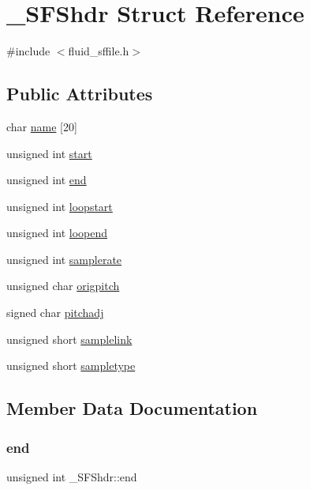 \hypertarget{struct__SFShdr}{}\section{\+\_\+\+S\+F\+Shdr Struct Reference}
\label{struct__SFShdr}


{\ttfamily \#include $<$fluid\+\_\+sffile.\+h$>$}

\subsection*{Public Attributes}
\begin{DoxyCompactItemize}
\item 
char \hyperlink{struct__SFShdr_ab26b0060affda31a0cab172d4caab7c0}{name} \mbox{[}20\mbox{]}
\item 
unsigned int \hyperlink{struct__SFShdr_a9c81221f5aa50e9ff3ce5641e6eefccc}{start}
\item 
unsigned int \hyperlink{struct__SFShdr_a7eeff297beb33b30f22b9e169abfc638}{end}
\item 
unsigned int \hyperlink{struct__SFShdr_a70ef5d37c79dcaf9274914b14225042b}{loopstart}
\item 
unsigned int \hyperlink{struct__SFShdr_af9a507e366da9ede0215871f94c3c68a}{loopend}
\item 
unsigned int \hyperlink{struct__SFShdr_a9a8bedaf06291953af81cf889d5f073a}{samplerate}
\item 
unsigned char \hyperlink{struct__SFShdr_a05e08d087cc2121eb0879505452b80bd}{origpitch}
\item 
signed char \hyperlink{struct__SFShdr_ab499e5916aa7c962bd389385210ade79}{pitchadj}
\item 
unsigned short \hyperlink{struct__SFShdr_a2698f3384071d854201d6719288c812c}{samplelink}
\item 
unsigned short \hyperlink{struct__SFShdr_aefd124fda80188b744942998edcbe88c}{sampletype}
\end{DoxyCompactItemize}


\subsection{Member Data Documentation}
\mbox{\label{struct__SFShdr_a7eeff297beb33b30f22b9e169abfc638}} 
\subsubsection{\texorpdfstring{end}{end}}
{\footnotesize\ttfamily unsigned int \+\_\+\+S\+F\+Shdr\+::end}

